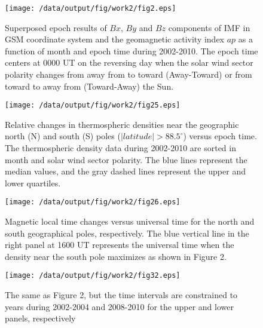 \documentclass[draft,grl]{/home/gdj/文档/template/agu_template/AGUTeX}
\begin{document}
\begin{figure}
    \centering
    \noindent\texttt{[image: /data/output/fig/work2/fig2.eps]}
    \caption{Superposed epoch results of $Bx$, $By$ and $Bz$ components of IMF in GSM coordinate system and the geomagnetic activity index $ap$ as a function of month and epoch time during 2002-2010. The epoch time centers at 0000 UT on the reversing day when the solar wind sector polarity changes from away from to toward (Away-Toward) or from toward to away from (Toward-Away) the Sun. }
    \label{figure1}
\end{figure}
\begin{figure}
    \centering
    \noindent\texttt{[image: /data/output/fig/work2/fig25.eps]}
    \caption{Relative changes in thermospheric densities near the geographic north (N) and south (S) poles ($\left|latitude\right| > 88.5^\circ$) versus epoch time. The thermospheric density data during 2002-2010 are sorted in month and solar wind sector polarity. The blue lines represent the median values, and the gray dashed lines represent the upper and lower quartiles.}
    \label{figure2}
\end{figure}
\begin{figure}
    \centering
    \noindent\texttt{[image: /data/output/fig/work2/fig26.eps]}
    \caption{ Magnetic local time changes versus universal time for the north and south geographical poles, respectively. The blue vertical line in the right panel at 1600 UT represents the universal time when the density near the south pole maximizes as shown in Figure 2.}
    \label{figure3}
\end{figure}
\begin{figure}
    \centering
    \noindent\texttt{[image: /data/output/fig/work2/fig32.eps]}
    \caption{The same as Figure 2, but the time intervals are constrained to years during 2002-2004 and 2008-2010 for the upper and lower panels, respectively}
    \label{figure4}
\end{figure}

\end{document}
